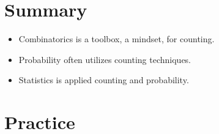 \documentclass[main.tex]{subfiles}
\begin{document}
\section{Summary}

\begin{itemize}
	\item Combinatorics is a toolbox, a mindset, for counting.
	\item Probability often utilizes counting techniques.
	\item Statistics is applied counting and probability.
\end{itemize}

\section{Practice}
\end{document}
